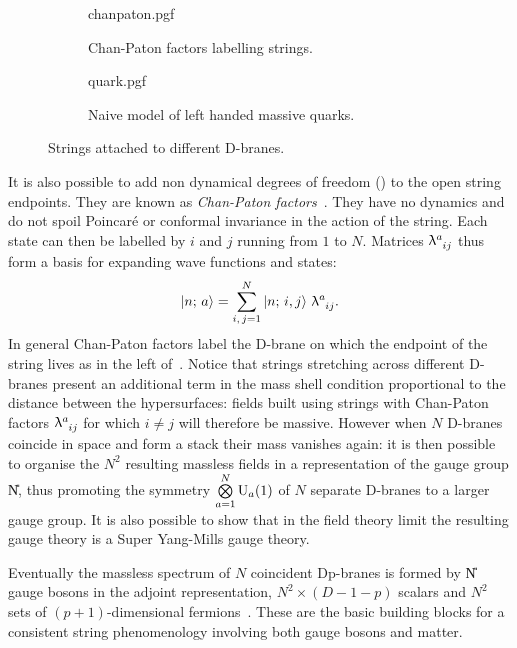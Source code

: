 \begin{figure}[tbp]
  \centering
  \begin{subfigure}[b]{0.45\linewidth}
    \centering
    {chanpaton.pgf}
    \caption{Chan-Paton factors labelling strings.}
  \end{subfigure}
  \hfill
  \begin{subfigure}[b]{0.45\linewidth}
    \centering
    {quark.pgf}
    \caption{Naive model of left handed massive quarks.}
  \end{subfigure}
  \caption{Strings attached to different D-branes.}
  \label{fig:dbranes:chanpaton}
\end{figure}

It is also possible to add non dynamical degrees of freedom (\dof) to the open string endpoints.
They are known as \emph{Chan-Paton factors}~\cite{Chan:1969:GeneralizedVenezianoModel}.
They have no dynamics and do not spoil Poincaré or conformal invariance in the action of the string.
Each state can then be labelled by $i$ and $j$ running from $1$ to $N$.
Matrices $\tensor{\lambda}{^a_{ij}}$ thus form a basis for expanding wave functions and states:
\begin{equation}
  \ket{n;\, a} = \sum\limits_{i,\, j = 1}^N \ket{n;\, i, j}\, \tensor{\lambda}{^a_i_j}.
\end{equation}
In general Chan-Paton factors label the D-brane on which the endpoint of the string lives as in the left of~.
Notice that strings stretching across different D-branes present an additional term in the mass shell condition proportional to the distance between the hypersurfaces: fields built using strings with Chan-Paton factors $\tensor{\lambda}{^a_i_j}$ for which $i \neq j$ will therefore be massive.
However when $N$ D-branes coincide in space and form a stack their mass vanishes again: it is then possible to organise the $N^2$ resulting massless fields in a representation of the gauge group \U{N}, thus promoting the symmetry $\bigotimes\limits_{a = 1}^N \mathrm{U}_a( 1 )$ of $N$ separate D-branes to a larger gauge group.
It is also possible to show that in the field theory limit the resulting gauge theory is a Super Yang-Mills gauge theory.

Eventually the massless spectrum of $N$ coincident Dp-branes is formed by \U{N} gauge bosons in the adjoint representation, $N^2 \times (D - 1 - p)$ scalars and $N^2$ sets of $(p+1)$-dimensional fermions~\cite{Uranga:2005:TASILecturesString}.
These are the basic building blocks for a consistent string phenomenology involving both gauge bosons and matter.


